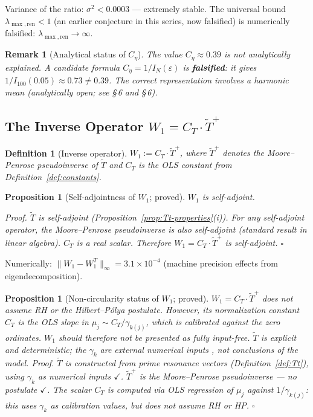 \documentclass[11pt]{article}
\newtheorem{proposition}[theorem]{Proposition}
\newtheorem{definition}[theorem]{Definition}
\newtheorem*{remark}{Remark}
\newcommand{\Tt}{\widetilde{T}}
\newcommand{\Ceta}{C_{\eta}}
\newcommand{\CT}{C_{T}}
\newcommand{\Wone}{W_1}
\begin{document}
Variance of the ratio: $\sigma^2 < 0.0003$ --- extremely stable.
The universal bound $\lambda_{\max,\mathrm{ren}} < 1$
(an earlier conjecture in this series, now falsified) is numerically falsified:
$\lambda_{\max,\mathrm{ren}}\to\infty$.

\begin{remark}[Analytical status of $\Ceta$]
The value $\Ceta\approx 0.39$ is not analytically explained.
A candidate formula $\Ceta = 1/I_N(\varepsilon)$ is \textbf{falsified}:
it gives $1/I_{100}(0.05)\approx 0.73\neq 0.39$.
The correct representation involves a harmonic mean
(analytically open; see \S\,6 and \S\,6).
\end{remark}

\subsection{The Inverse Operator $\Wone = \CT\cdot\Tt^+$}

\begin{definition}[Inverse operator]
$\Wone := \CT\cdot\Tt^+$,
where $\Tt^+$ denotes the Moore--Penrose pseudoinverse of $\Tt$
and $\CT$ is the OLS constant from Definition~\ref{def:constants}.
\end{definition}

\begin{proposition}[Self-adjointness of $\Wone$; proved]\label{prop:W1-sa}
$\Wone$ is self-adjoint.

\emph{Proof.}
$\Tt$ is self-adjoint (Proposition~\ref{prop:Tt-properties}(i)).
For any self-adjoint operator, the Moore--Penrose pseudoinverse is also
self-adjoint (standard result in linear algebra).
$\CT$ is a real scalar.
Therefore $\Wone = \CT\cdot\Tt^+$ is self-adjoint. $\square$
\end{proposition}

Numerically: $\|\Wone - \Wone^T\|_\infty = 3.1\times 10^{-4}$
(machine precision effects from eigendecomposition).

\begin{proposition}[Non-circularity status of $\Wone$; proved]\label{prop:W1-circ}
	$\Wone = \CT\cdot\Tt^+$ does not assume RH or the Hilbert--P\'olya postulate.
	However, its normalization constant $\CT$ is the OLS slope in
	$\mu_j\sim\CT/\gamma_{k(j)}$, which is calibrated against the zero ordinates.
	$\Wone$ should therefore not be presented as fully input-free.
	$\Tt$ is explicit and deterministic; the $\gamma_k$ are external
	numerical inputs , not conclusions of the model.
	\emph{Proof.}
	$\Tt$ is constructed from prime resonance vectors
	(Definition~\ref{def:Tt}), using $\gamma_k$ as numerical inputs $\checkmark$.
	$\Tt^+$ is the Moore--Penrose pseudoinverse --- no postulate $\checkmark$.
	The scalar $\CT$ is computed via OLS regression of $\mu_j$ against
	$1/\gamma_{k(j)}$: this uses $\gamma_k$ as calibration values, but
	does not assume RH or HP. $\square$
\end{proposition}
\end{document}
